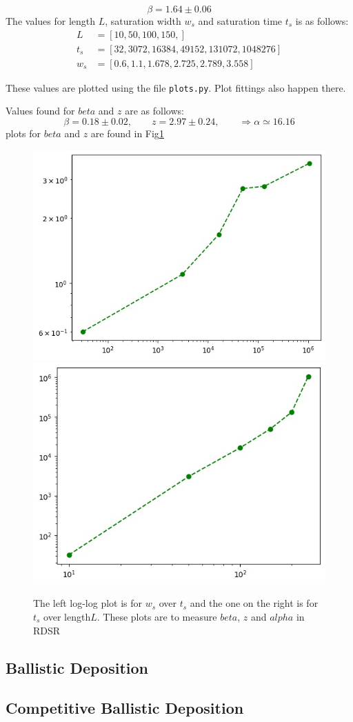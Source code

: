 \documentclass[12pt]{article}
\begin{document}
	\begin{equation*}
		\beta = 1.64 \pm 0.06
	\end{equation*}
	The values for length $L$, saturation width $w_s$ and saturation time $t_s$ is as follows:
	\begin{equation*}
		\begin{aligned}
			L		 &= [10, 50, 100, 150, ]\\
			t_s		&= [32, 3072, 16384, 49152, 131072, 1048276]\\
			w_s	  &= [0.6, 1.1, 1.678, 2.725, 2.789, 3.558] 
		\end{aligned}
	\end{equation*}
	
	These values are plotted using the file \texttt{plots.py}. Plot fittings also happen there.
	
	Values found for $beta$ and $z$ are as follows:
	\begin{equation*}
		\beta = 0.18 \pm 0.02, \qquad z = 2.97 \pm 0.24, \qquad \Rightarrow \alpha \simeq 16.16
	\end{equation*}
	plots for $beta$ and $z$ are found in Fig\ref{fig:beta_z}
	\begin{figure}[h!]
		\centering
		\includegraphics[width=.4\linewidth]{../P5/beta.jpg}
		\includegraphics[width=.4\linewidth]{../P5/z.jpg}
		\label{fig:beta_z}
		\caption{The left log-log plot is for $w_s$ over $t_s$ and the one on the right is for 
		$t_s$ over length$L$. These plots are to measure $beta$, $z$ and $alpha$ in RDSR}
	\end{figure}
	
	\subsection{Ballistic Deposition}
	
	\subsection{Competitive Ballistic Deposition}
\end{document}
